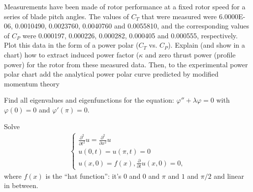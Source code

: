 \documentclass[12pt]{exam}
\newcommand{\pt}{\frac{\partial}{\partial t}}
\newcommand{\pxx}{\frac{\partial^2}{\partial x^2}}
\newcommand{\ptt}{\frac{\partial^2}{\partial t^2}}
\begin{document}
\begin{questions}
\newpage 
\begin{question}
Measurements have been made of rotor performance at a fixed rotor speed for a series of
blade pitch angles. The values of \(C_T\) that were measured were 6.0000E-06, 0.0010490,
0.0023760, 0.0040760 and 0.0055810, and the corresponding values of \(C_P\) were 0.000197,
0.000226, 0.000282, 0.000405 and 0.000555, respectively. Plot this data in the form of a
power polar (\(C_T\) vs. \(C_P\)). Explain (and show in a chart) how to extract induced power factor
(\(\kappa\) and zero thrust power (profile power) for the rotor from these measured data. Then, to
the experimental power polar chart add the analytical power polar curve predicted by
modified momentum theory
\end{question}
\begin{solutionorbox}[\stretch{1}]
\end{solutionorbox}


\newpage 
\begin{question}
Find all eigenvalues and eigenfunctions for the equation: 
$\varphi'' + \lambda \varphi = 0$ with $\varphi(0) = 0$ and $\varphi'(\pi) = 0.$
\end{question}
\begin{solutionorbox}[\stretch{1}]
\end{solutionorbox}


\newpage 
\begin{question}
Solve 
\begin{align*}
\begin{cases}
\ptt u = \pxx u\\ 
u(0, t) = u(\pi, t) = 0\\ 
u(x,0) = f(x), \pt u(x,0) = 0,
\end{cases}
\end{align*}
where $f(x)$ is the ``hat function'': it's $0$ and $0$ and $\pi$ and $1$ and $\pi/2$ and 
linear in between. 
\end{question}
\begin{solutionorbox}[\stretch{1}]
\end{solutionorbox}



\end{questions}
\end{document}
